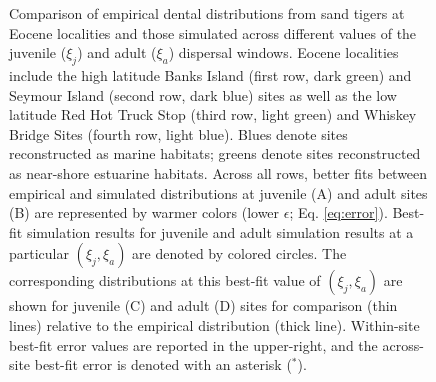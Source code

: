 \documentclass[]{rsos}%
\begin{document}
\begin{figure}[ht]
\caption{
Comparison of empirical dental distributions from sand tigers at Eocene localities and those simulated across different values of the juvenile ($\xi_j$) and adult ($\xi_a$) dispersal windows.
Eocene localities include the high latitude Banks Island (first row, dark green) and Seymour Island (second row, dark blue) sites as well as the low latitude Red Hot Truck Stop (third row, light green) and Whiskey Bridge Sites (fourth row, light blue).
Blues denote sites reconstructed as marine habitats; greens denote sites reconstructed as near-shore estuarine habitats.
Across all rows, better fits between empirical and simulated distributions at juvenile (A) and adult sites (B) are represented by warmer colors (lower $\epsilon$; Eq. \ref{eq:error}). 
Best-fit simulation results for juvenile and adult simulation results at a particular $(\xi_j,\xi_a)$ are denoted by colored circles.
The corresponding distributions at this best-fit value of $(\xi_j,\xi_a)$ are shown for juvenile (C) and adult (D) sites for comparison (thin lines) relative to the empirical distribution (thick line). 
Within-site best-fit error values are reported in the upper-right, and the across-site best-fit error is denoted with an asterisk (${}^\ast$).}
\label{fig:comp}
\end{figure}


\clearpage
% 
% 
\end{document}
